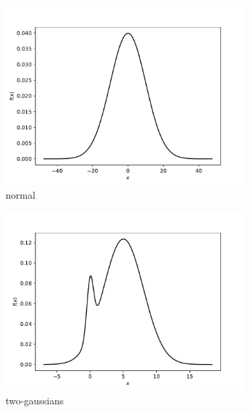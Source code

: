 \documentclass{article}
\begin{document}
\begin{figure}[htb]
    \centering %
\begin{subfigure}{0.333\textwidth}
  \includegraphics[width=\linewidth]{benchmark_distributions/norm.pdf}
  \caption{normal}
  \label{fig:normal}
\end{subfigure}\hfil %
\begin{subfigure}{0.333\textwidth}
  \includegraphics[width=\linewidth]{benchmark_distributions/two_gaussians.pdf}
  \caption{two-gaussians}
  \label{fig:two-gaussians}
\end{subfigure}\hfil %
\begin{subfigure}{0.333\textwidth}

\end{subfigure}
\end{figure}
\end{document}
